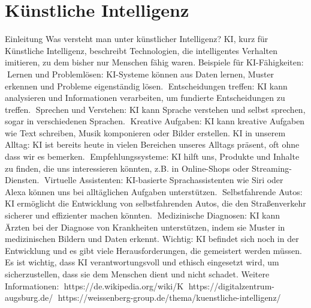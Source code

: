\section{Künstliche Intelligenz}
\label{sec:ai}

Einleitung
Was versteht man unter künstlicher Intelligenz?
KI, kurz für Künstliche Intelligenz, beschreibt Technologien, die intelligentes Verhalten imitieren, zu dem bisher nur Menschen fähig waren.
Beispiele für KI-Fähigkeiten:
Lernen und Problemlösen: KI-Systeme können aus Daten lernen, Muster erkennen und Probleme eigenständig lösen.
Entscheidungen treffen: KI kann analysieren und Informationen verarbeiten, um fundierte Entscheidungen zu treffen.
Sprechen und Verstehen: KI kann Sprache verstehen und selbst sprechen, sogar in verschiedenen Sprachen.
Kreative Aufgaben: KI kann kreative Aufgaben wie Text schreiben, Musik komponieren oder Bilder erstellen.
KI in unserem Alltag:
KI ist bereits heute in vielen Bereichen unseres Alltags präsent, oft ohne dass wir es bemerken.
Empfehlungssysteme: KI hilft uns, Produkte und Inhalte zu finden, die uns interessieren könnten, z.B. in Online-Shops oder Streaming-Diensten.
Virtuelle Assistenten: KI-basierte Sprachassistenten wie Siri oder Alexa können uns bei alltäglichen Aufgaben unterstützen.
Selbstfahrende Autos: KI ermöglicht die Entwicklung von selbstfahrenden Autos, die den Straßenverkehr sicherer und effizienter machen könnten.
Medizinische Diagnosen: KI kann Ärzten bei der Diagnose von Krankheiten unterstützen, indem sie Muster in medizinischen Bildern und Daten erkennt.
Wichtig: KI befindet sich noch in der Entwicklung und es gibt viele Herausforderungen, die gemeistert werden müssen.
Es ist wichtig, dass KI verantwortungsvoll und ethisch eingesetzt wird, um sicherzustellen, dass sie dem Menschen dient und nicht schadet.
Weitere Informationen:
https://de.wikipedia.org/wiki/K%
https://digitalzentrum-augsburg.de/
https://weissenberg-group.de/thema/kuenstliche-intelligenz/


